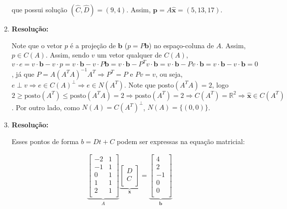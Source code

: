 \documentclass[leqno]{article}
\newcommand{\pst}[1]{\text{posto}(#1)}
\begin{document}
\begin{enumerate}
    que possui solução $(\hat{C},\hat{D})=(9,4)$. Assim, $\textbf{p}=A\hat{\textbf{x}}=(5,13,17)$.
    
    \item 
    
    \textbf{Resolução:}

    Note que o vetor $p$ é a projeção de $\textbf{b}$ ($p=P\textbf{b}$) no espaço-coluna de $A$. Assim, $p\in C(A)$. Assim, sendo $v$ um vetor qualquer de $C(A)$, $v\cdot e=v\cdot \textbf{b}-v\cdot p=v\cdot \textbf{b}-v\cdot P\textbf{b}=v\cdot \textbf{b}-P^Tv\cdot\textbf{b}=v\cdot \textbf{b}-Pv\cdot\textbf{b}=v\cdot \textbf{b}-v\cdot\textbf{b}=0$, já que $P=A(A^TA)^{-1}A^T\Rightarrow P^T=P$ e $Pv=v$, ou seja, $e\perp v\Rightarrow e\in C(A)^{\perp}\Rightarrow e\in N(A^T)$. Note que $\pst{A^TA}=2$, logo $2\geq\pst{A^T}\leq\pst{A^TA}=2\Rightarrow\pst{A^T}=2\Rightarrow C(A^T)=\mathbb{R}^2\Rightarrow \hat{\textbf{x}}\in C(A^T)$. Por outro lado, como $N(A)=C(A^T)^{\perp}$, $N(A)=\{(0,0)\}$.  
    
    \item 
    
    \textbf{Resolução:}
    
    Esses pontos de forma $b=Dt+C$ podem ser expressas na equação matricial:
    
    \begin{align*}
        \underbrace{\begin{bmatrix}
            -2 & 1\\
            -1 & 1\\
            0 & 1\\
            1 & 1\\
            2 & 1\\
        \end{bmatrix}}_A\underbrace{\begin{bmatrix}
            D\\
            C\\
        \end{bmatrix}}_{\textbf{x}}=\underbrace{\begin{bmatrix}
            4\\
            2\\
            -1\\
            0\\
            0\\
        \end{bmatrix}}_{\textbf{b}}
    \end{align*}
    

\end{enumerate}
\end{document}
